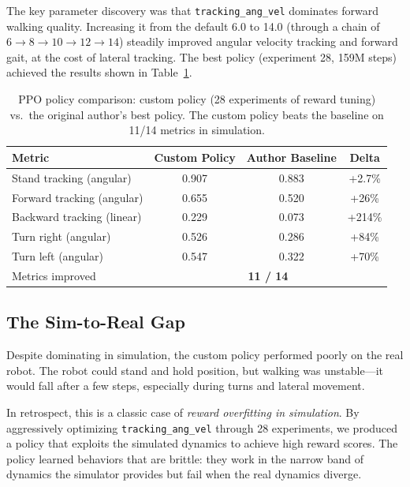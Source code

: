 \documentclass{article}
\begin{document}
The key parameter discovery was that \texttt{tracking\_ang\_vel} dominates forward walking quality. Increasing it from the default 6.0 to 14.0 (through a chain of $6 \rightarrow 8 \rightarrow 10 \rightarrow 12 \rightarrow 14$) steadily improved angular velocity tracking and forward gait, at the cost of lateral tracking. The best policy (experiment 28, 159M steps) achieved the results shown in Table~\ref{tab:ppo_comparison}.

\begin{table}[t]
\caption{PPO policy comparison: custom policy (28 experiments of reward tuning) vs.\ the original author's best policy. The custom policy beats the baseline on 11/14 metrics in simulation.}
\label{tab:ppo_comparison}
\centering
\begin{tabular}{lccc}
\toprule
Metric & Custom Policy & Author Baseline & Delta \\
\midrule
Stand tracking (angular) & 0.907 & 0.883 & +2.7\% \\
Forward tracking (angular) & 0.655 & 0.520 & +26\% \\
Backward tracking (linear) & 0.229 & 0.073 & +214\% \\
Turn right (angular) & 0.526 & 0.286 & +84\% \\
Turn left (angular) & 0.547 & 0.322 & +70\% \\
\midrule
Metrics improved & \multicolumn{3}{c}{\textbf{11 / 14}} \\
\bottomrule
\end{tabular}
\end{table}


\subsection{The Sim-to-Real Gap}

Despite dominating in simulation, the custom policy performed poorly on the real robot. The robot could stand and hold position, but walking was unstable---it would fall after a few steps, especially during turns and lateral movement.

In retrospect, this is a classic case of \emph{reward overfitting in simulation}. By aggressively optimizing \texttt{tracking\_ang\_vel} through 28 experiments, we produced a policy that exploits the simulated dynamics to achieve high reward scores. The policy learned behaviors that are brittle: they work in the narrow band of dynamics the simulator provides but fail when the real dynamics diverge.
\end{document}
